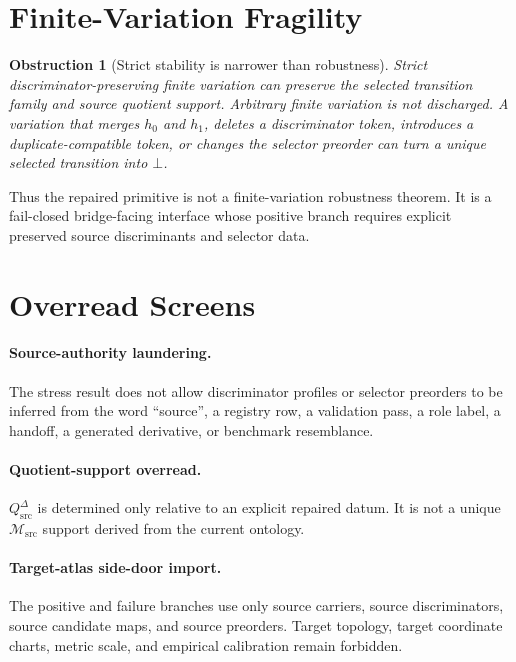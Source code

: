 \documentclass[11pt]{article}
\newcommand{\Msrc}{\mathcal{M}_{\mathrm{src}}}
\newcommand{\Qdisc}{Q_{\mathrm{src}}^{\Delta}}
\newtheorem{obstruction}{Obstruction}
\begin{document}
\section{Finite-Variation Fragility}

\begin{obstruction}[Strict stability is narrower than robustness]
Strict discriminator-preserving finite variation can preserve the selected
transition family and source quotient support. Arbitrary finite variation is
not discharged. A variation that merges \(h_0\) and \(h_1\), deletes a
discriminator token, introduces a duplicate-compatible token, or changes the
selector preorder can turn a unique selected transition into \(\bot\).
\end{obstruction}

Thus the repaired primitive is not a finite-variation robustness theorem. It
is a fail-closed bridge-facing interface whose positive branch requires
explicit preserved source discriminants and selector data.

\section{Overread Screens}

\paragraph{Source-authority laundering.}
The stress result does not allow discriminator profiles or selector preorders
to be inferred from the word ``source'', a registry row, a validation pass, a
role label, a handoff, a generated derivative, or benchmark resemblance.

\paragraph{Quotient-support overread.}
\(\Qdisc\) is determined only relative to an explicit repaired datum. It is
not a unique \(\Msrc\) support derived from the current ontology.

\paragraph{Target-atlas side-door import.}
The positive and failure branches use only source carriers, source
discriminators, source candidate maps, and source preorders. Target topology,
target coordinate charts, metric scale, and empirical calibration remain
forbidden.
\end{document}
